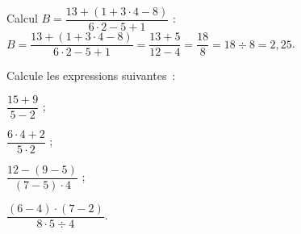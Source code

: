 \begin{methode*1}

\begin{exemple*1}
Calcul $B = \dfrac{13 + (1+ 3 \cdot 4 - 8)}{6 \cdot 2 - 5 + 1}$ : \\[1em]
$B = \dfrac{13 + (1+ 3 \cdot 4 - 8)}{6 \cdot 2 - 5 + 1} = \dfrac{13 + 5}{12 - 4} = \dfrac{18}{8} = 18 \div 8 = 2,25$.
\end{exemple*1}


 \exercice 
Calcule les expressions suivantes :
\begin{colenumerate}{4}
\item $\dfrac{15 +9}{5 - 2}$ ;
\item $\dfrac{6 \cdot 4 + 2}{5 \cdot 2}$ ;
\item $\dfrac{12 - (9 - 5)}{(7- 5) \cdot 4}$ ;
\item $\dfrac{(6 - 4) \cdot (7 - 2)}{8 \cdot 5 \div 4}$.
 \end{colenumerate}

\end{methode*1}
